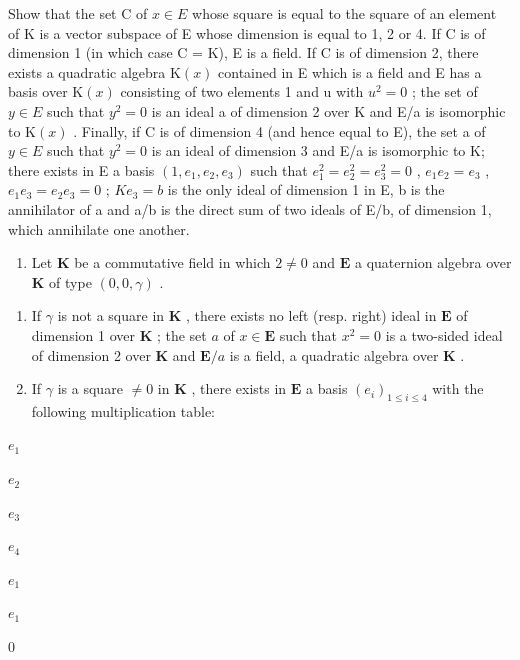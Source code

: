 Show that the set C of \(x \in E\) whose square is equal to the square of an element of K is a vector subspace of E whose dimension is equal to 1, 2 or 4. If C is of dimension 1 (in which case C = K), E is a field. If C is of dimension 2, there exists a quadratic algebra \(\mathrm{K}(x)\) contained in E which is a field and E has a basis over \(\mathrm{K}(x)\) consisting of two elements 1 and u with \(u^{2} = 0\) ; the set of \(y \in E\) such that \(y^{2} = 0\) is an ideal a of dimension 2 over K and E/a is isomorphic to \(\mathrm{K}(x)\) . Finally, if C is of dimension 4 (and hence equal to E), the set a of \(y \in E\) such that \(y^{2} = 0\) is an ideal of dimension 3 and E/a is isomorphic to K; there exists in E a basis \((1, e_{1}, e_{2}, e_{3})\) such that \(e_{1}^{2} = e_{2}^{2} = e_{3}^{2} = 0\) , \(e_{1}e_{2} = e_{3}\) , \(e_{1}e_{3} = e_{2}e_{3} = 0\) ; \(Ke_{3} = b\) is the only ideal of dimension 1 in E, b is the annihilator of a and a/b is the direct sum of two ideals of E/b, of dimension 1, which annihilate one another.

\begin{enumerate}
\def\labelenumi{\arabic{enumi}.}
\setcounter{enumi}{5}
\tightlist
\item
  Let \(\mathbf{K}\) be a commutative field in which \(2 \neq 0\) and \(\mathbf{E}\) a quaternion algebra over \(\mathbf{K}\) of type \((0, 0, \gamma)\) .
\end{enumerate}

\begin{enumerate}
\def\labelenumi{(\alph{enumi})}
\item
  If \(\gamma\) is not a square in \(\mathbf{K}\) , there exists no left (resp. right) ideal in \(\mathbf{E}\) of dimension 1 over \(\mathbf{K}\) ; the set \(a\) of \(x \in \mathbf{E}\) such that \(x^2 = 0\) is a two-sided ideal of dimension 2 over \(\mathbf{K}\) and \(\mathbf{E} / a\) is a field, a quadratic algebra over \(\mathbf{K}\) .
\item
  If \(\gamma\) is a square \(\neq 0\) in \(\mathbf{K}\) , there exists in \(\mathbf{E}\) a basis \((e_i)_{1\leq i\leq 4}\) with the following multiplication table:
\end{enumerate}

\(e_1\)

\(e_2\)

\(e_3\)

\(e_4\)

\(e_1\)

\(e_1\)

0


